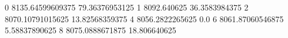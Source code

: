 0 8135.64599609375 79.36376953125
1 8092.640625 36.3583984375
2 8070.10791015625 13.82568359375
4 8056.2822265625 0.0
6 8061.87060546875 5.58837890625
8 8075.0888671875 18.806640625
